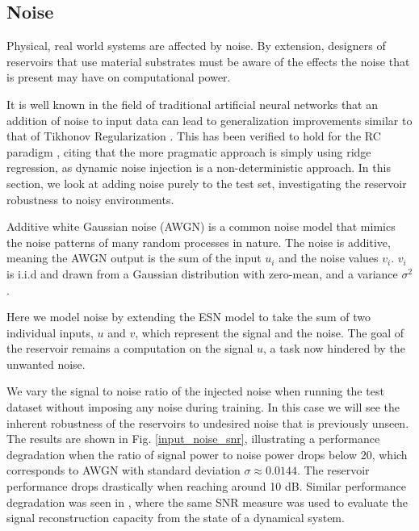 

\subsection{Noise}

Physical, real world systems are affected by noise. By extension, designers of
reservoirs that use material substrates must be aware of the effects the noise
that is present may have on computational power.

It is well known in the field of traditional artificial neural networks that an
addition of noise to input data can lead to generalization improvements similar
to that of Tikhonov Regularization \cite{bishop_training_1995}. This has been
verified to hold for the RC paradigm \cite{kurkova_stable_2008}, citing that the
more pragmatic approach is simply using ridge regression, as dynamic noise
injection is a non-deterministic approach. In this section, we look at adding
noise purely to the test set, investigating the reservoir robustness to noisy
environments.

Additive white Gaussian noise (AWGN) is a common noise model that mimics the
noise patterns of many random processes in nature. The noise is additive,
meaning the AWGN output is the sum of the input $u_{i}$ and the noise values
$v_{i}$. $v_{i}$ is i.i.d and drawn from a Gaussian distribution with zero-mean,
and a variance $\sigma^{2}$.

Here we model noise by extending the ESN model to take the sum of two individual
inputs, $u$ and $v$, which represent the signal and the noise. The goal of the
reservoir remains a computation on the signal $u$, a task now hindered by the
unwanted noise.

We vary the signal to noise ratio of the injected noise when running the test
dataset without imposing any noise during training. In this case we will see the
inherent robustness of the reservoirs to undesired noise that is previously
unseen. The results are shown in Fig. \ref{input_noise_snr}, illustrating a
performance degradation when the ratio of signal power to noise power drops
below 20, which corresponds to AWGN with standard deviation $\sigma \approx
0.0144$. The reservoir performance drops drastically when reaching around 10
dB. Similar performance degradation was seen in \cite{dambre_information_2012},
where the same SNR measure was used to evaluate the signal reconstruction
capacity from the state of a dynamical system.

